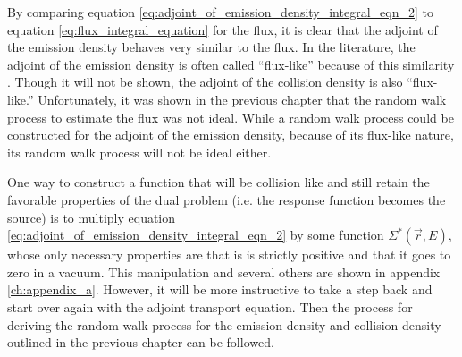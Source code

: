 By comparing equation \ref{eq:adjoint_of_emission_density_integral_eqn_2} to 
equation \ref{eq:flux_integral_equation} for the flux, it is clear that
the adjoint of the emission density behaves very similar to the flux. In the 
literature, the adjoint of the emission density is often called ``flux-like'' 
because of this similarity \citep{hoogenboom_adjoint_1977}. Though it will not 
be shown, the adjoint of the collision density is also ``flux-like.'' 
Unfortunately, it was shown in the previous chapter that the random walk process 
to estimate the flux was not ideal. While a random walk process could be 
constructed for the adjoint of the emission density, because of its flux-like 
nature, its random walk process will not be ideal either. 

One way to construct a function that will be collision like and still retain
the favorable properties of the dual problem (i.e. the response function 
becomes the source) is to multiply equation 
\ref{eq:adjoint_of_emission_density_integral_eqn_2} by some function 
$\Sigma^{*}(\vec{r},E)$, whose only necessary properties are that is is
strictly positive and that it goes to zero in a vacuum. This manipulation and 
several others are shown in appendix \ref{ch:appendix_a}. However, it will be 
more instructive to take a step back and start over again with the adjoint 
transport equation. Then the process for deriving the random walk process for 
the emission density and collision density outlined in the previous chapter 
can be followed. 

